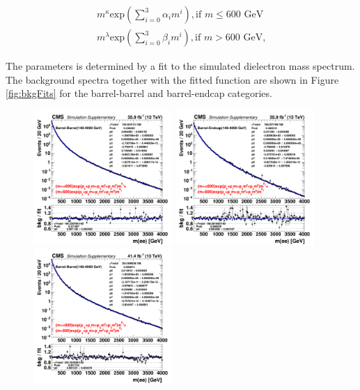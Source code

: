 \begin{equation}
\begin{split}
m^{\kappa}\mathrm{exp}(\sum\limits_{i=0}^3 \alpha_{i} m^{i}), \mbox{if }m \le \mbox{600 GeV} \\
m^{\lambda}\mathrm{exp}(\sum\limits_{i=0}^3 \beta_{i} m^{i}), \mbox{if }m > \mbox{600 GeV,}
\end{split}
\label{eq:bkgshape}
\end{equation}

The parameters is determined by a fit to the simulated dielectron mass spectrum.
The background spectra together with the fitted function are shown in Figure \ref{fig:bkgFits} for the barrel-barrel and barrel-endcap categories.


\begin{figure}
  \begin{center}
    \includegraphics[width=0.47\textwidth]{figures/Zprime/2016/bgkfit/BB_140_4000_bgk.png}
    \includegraphics[width=0.47\textwidth]{figures/Zprime/2016/bgkfit/BE_140_4000_bgk.png}
    \includegraphics[width=0.47\textwidth]{figures/Zprime/2017/bgkfit/BB__bgk.png}

\end{center}
\end{figure}
